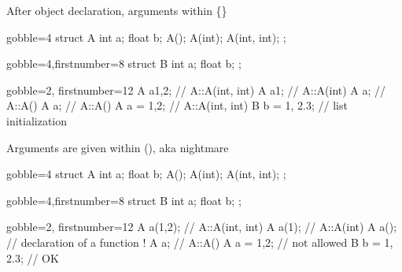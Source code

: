 \begin{frame}[fragile]
  \begin{block}{After object declaration, arguments within \{\}}
    \begin{multicols}{2}
      \begin{cppcode*}{gobble=4}
        struct A {
          int a;
          float b;
          A();
          A(int);
          A(int, int);
        };
      \end{cppcode*}
      \columnbreak
      \begin{cppcode*}{gobble=4,firstnumber=8}
        struct B {
          int a;
          float b;
        };
      \end{cppcode*}
    \end{multicols}
    \begin{cppcode*}{gobble=2, firstnumber=12}
      A a{1,2};       // A::A(int, int)
      A a{1};         // A::A(int)
      A a{};          // A::A()
      A a;            // A::A()
      A a = {1,2};    // A::A(int, int)
      B b = {1, 2.3}; // list initialization
    \end{cppcode*}
  \end{block}
\end{frame}

\begin{frame}[fragile]
  \begin{block}{Arguments are given within (), aka  nightmare}
    \begin{multicols}{2}
      \begin{cppcode*}{gobble=4}
        struct A {
          int a;
          float b;
          A();
          A(int);
          A(int, int);
        };
      \end{cppcode*}
      \columnbreak
      \begin{cppcode*}{gobble=4,firstnumber=8}
        struct B {
          int a;
          float b;
        };
      \end{cppcode*}
    \end{multicols}
    \begin{cppcode*}{gobble=2, firstnumber=12}
      A a(1,2);       // A::A(int, int)
      A a(1);         // A::A(int)
      A a();          // declaration of a function !
      A a;            // A::A()
      A a = {1,2};    // not allowed
      B b = {1, 2.3}; // OK
    \end{cppcode*}
  \end{block}
\end{frame}


